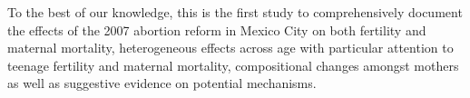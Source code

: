 \documentclass[a4paper, 11pt]{article}
\begin{document}
\begin{spacing}{2}

To the best of our knowledge, this is the first study to comprehensively document the effects of the 2007 abortion reform in Mexico City on both fertility and maternal mortality, heterogeneous effects across age with particular attention to teenage fertility and maternal mortality, compositional changes amongst mothers as well as suggestive evidence on potential mechanisms.          



\end{spacing}
\end{document}
